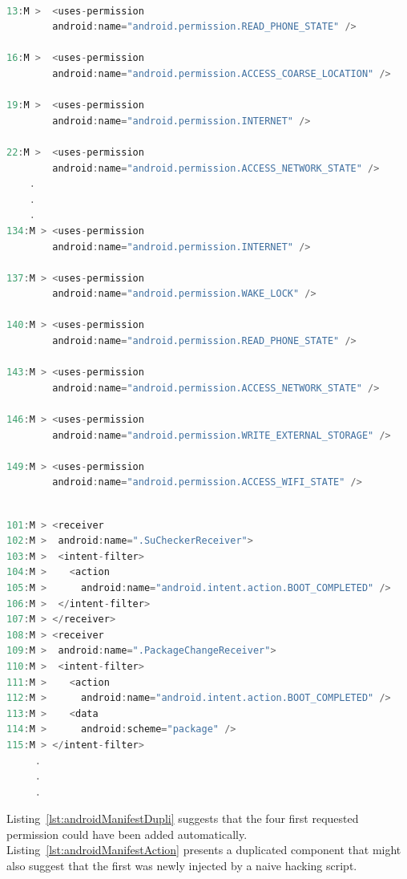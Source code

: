 \begin{lstlisting}[caption={Example of duplicated permission from malicious version of app (com.ifeel.frogjump)}, language=Java,
    basicstyle=\fontsize{5}{4}\selectfont\ttfamily,
    label={lst:androidManifestDupli}]

13:M >  <uses-permission
        android:name="android.permission.READ_PHONE_STATE" />

16:M >  <uses-permission
        android:name="android.permission.ACCESS_COARSE_LOCATION" />

19:M >  <uses-permission
        android:name="android.permission.INTERNET" />

22:M >  <uses-permission
        android:name="android.permission.ACCESS_NETWORK_STATE" />
    .
    .
    .
134:M > <uses-permission
        android:name="android.permission.INTERNET" />

137:M > <uses-permission
        android:name="android.permission.WAKE_LOCK" />

140:M > <uses-permission
        android:name="android.permission.READ_PHONE_STATE" />

143:M > <uses-permission
        android:name="android.permission.ACCESS_NETWORK_STATE" />

146:M > <uses-permission
        android:name="android.permission.WRITE_EXTERNAL_STORAGE" />

149:M > <uses-permission
        android:name="android.permission.ACCESS_WIFI_STATE" />
\end{lstlisting}

\begin{lstlisting}[caption={An example of duplicated component capability from malicious version of app (com.koushikdutta.superuser)}, language=Java,
    basicstyle=\fontsize{5}{4}\selectfont\ttfamily,
    label={lst:androidManifestAction}]

101:M > <receiver
102:M >  android:name=".SuCheckerReceiver">
103:M >  <intent-filter>
104:M >    <action
105:M >      android:name="android.intent.action.BOOT_COMPLETED" />                 
106:M >  </intent-filter>
107:M > </receiver>
108:M > <receiver
109:M >  android:name=".PackageChangeReceiver">
110:M >  <intent-filter>
111:M >    <action
112:M >      android:name="android.intent.action.BOOT_COMPLETED" />
113:M >    <data
114:M >      android:scheme="package" />
115:M > </intent-filter>
     .
     .
     .
\end{lstlisting}

Listing~\ref{lst:androidManifestDupli} suggests that the four first requested permission could have been added automatically. Listing~\ref{lst:androidManifestAction} presents a duplicated component that might also suggest that the first was newly injected by a naive hacking script.



